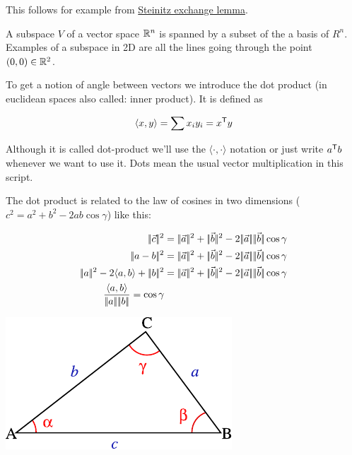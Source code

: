 This follows for example from \href{http://en.wikipedia.org/wiki/Steinitz_exchange_lemma}{Steinitz exchange lemma}.

\begin{Def}[Subspace]
 A subspace $V$ of a vector space $\mathbb{R}^n$ is spanned by a subset of the a basis of $R^n$. Examples of a subspace in 2D are all the lines going through the point $(0,0) \in \mathbb{R}^2$.
\end{Def}

To get a notion of angle between vectors we introduce the dot product (in euclidean spaces also called: inner product). It is defined as

\[\langle x,y\rangle  = \sum x_iy_i = {x}^\text{\upshape \sffamily T} y\]

Although it is called dot-product we'll use the $\langle \cdot,\cdot \rangle$ notation or just write ${a}^\text{\upshape \sffamily T} b$ whenever we want to use it. Dots mean the usual vector multiplication in this script. 

The dot product is related to the law of cosines in two dimensions ($c^2 = a^2+b^2-2ab\cos \gamma$) like this:

\begin{minipage}[hbt]{0.5\linewidth}
\begin{align*}
\norm{\vec c}^2 &= \norm{\vec a}^2 + \norm{\vec b}^2 -2\norm{\vec a}\norm{\vec b}\cos \gamma\\
\norm{a-b}^2 &= \norm{\vec a}^2 + \norm{\vec b}^2 -2\norm{\vec a}\norm{\vec b}\cos \gamma\\
\norm{a}^2-2\langle a,b\rangle +\norm{b}^2 &= \norm{\vec a}^2 + \norm{\vec b}^2 -2\norm{\vec a}\norm{\vec b}\cos \gamma\\
\frac{\langle a,b\rangle }{\norm{a}\norm{b}} = \cos \gamma
\end{align*}
\end{minipage}
\hfill
\begin{minipage}[hbt]{0.3\linewidth}
\includegraphics[scale=0.8]{./images/Triangle_with_notations_2.pdf}
\end{minipage}


